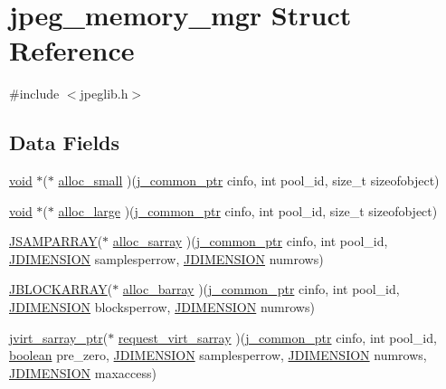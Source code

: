 \hypertarget{structjpeg__memory__mgr}{}\section{jpeg\+\_\+memory\+\_\+mgr Struct Reference}
\label{structjpeg__memory__mgr}


{\ttfamily \#include $<$jpeglib.\+h$>$}

\subsection*{Data Fields}
\begin{DoxyCompactItemize}
\item 
\hyperlink{png_8h_ac9c84fa68bbad002983e35ce3663c686}{void} $\ast$($\ast$ \hyperlink{structjpeg__memory__mgr_a682e2af140b98c505bf4a2310c59361b}{alloc\+\_\+small} )(\hyperlink{jpeglib_8h_a1a177ab705cefea8f30ec31a48e62650}{j\+\_\+common\+\_\+ptr} cinfo, int pool\+\_\+id, size\+\_\+t sizeofobject)
\item 
\hyperlink{png_8h_ac9c84fa68bbad002983e35ce3663c686}{void} $\ast$($\ast$ \hyperlink{structjpeg__memory__mgr_a92f58136389a42228d4380e0f16a16ab}{alloc\+\_\+large} )(\hyperlink{jpeglib_8h_a1a177ab705cefea8f30ec31a48e62650}{j\+\_\+common\+\_\+ptr} cinfo, int pool\+\_\+id, size\+\_\+t sizeofobject)
\item 
\hyperlink{jpeglib_8h_ac9d5d1b829ed51769db69a37271a7e91}{J\+S\+A\+M\+P\+A\+R\+R\+AY}($\ast$ \hyperlink{structjpeg__memory__mgr_a08372f39a3b7a2f48f0f27d6d8f6a2c3}{alloc\+\_\+sarray} )(\hyperlink{jpeglib_8h_a1a177ab705cefea8f30ec31a48e62650}{j\+\_\+common\+\_\+ptr} cinfo, int pool\+\_\+id, \hyperlink{jmorecfg_8h_a04ed4674f6f1d0d50ec241531e38274f}{J\+D\+I\+M\+E\+N\+S\+I\+ON} samplesperrow, \hyperlink{jmorecfg_8h_a04ed4674f6f1d0d50ec241531e38274f}{J\+D\+I\+M\+E\+N\+S\+I\+ON} numrows)
\item 
\hyperlink{jpeglib_8h_ab03cfeb937b60b9b73ca6e3cf935af49}{J\+B\+L\+O\+C\+K\+A\+R\+R\+AY}($\ast$ \hyperlink{structjpeg__memory__mgr_a59ff5a509aaecceb578d7c50ad29408e}{alloc\+\_\+barray} )(\hyperlink{jpeglib_8h_a1a177ab705cefea8f30ec31a48e62650}{j\+\_\+common\+\_\+ptr} cinfo, int pool\+\_\+id, \hyperlink{jmorecfg_8h_a04ed4674f6f1d0d50ec241531e38274f}{J\+D\+I\+M\+E\+N\+S\+I\+ON} blocksperrow, \hyperlink{jmorecfg_8h_a04ed4674f6f1d0d50ec241531e38274f}{J\+D\+I\+M\+E\+N\+S\+I\+ON} numrows)
\item 
\hyperlink{jpeglib_8h_abc0b975077507c35b5a577e3ce9e4d91}{jvirt\+\_\+sarray\+\_\+ptr}($\ast$ \hyperlink{structjpeg__memory__mgr_ae468489cab71fc3b5da594afb639f777}{request\+\_\+virt\+\_\+sarray} )(\hyperlink{jpeglib_8h_a1a177ab705cefea8f30ec31a48e62650}{j\+\_\+common\+\_\+ptr} cinfo, int pool\+\_\+id, \hyperlink{jconfig_8h_a7670a4e8a07d9ebb00411948b0bbf86d}{boolean} pre\+\_\+zero, \hyperlink{jmorecfg_8h_a04ed4674f6f1d0d50ec241531e38274f}{J\+D\+I\+M\+E\+N\+S\+I\+ON} samplesperrow, \hyperlink{jmorecfg_8h_a04ed4674f6f1d0d50ec241531e38274f}{J\+D\+I\+M\+E\+N\+S\+I\+ON} numrows, \hyperlink{jmorecfg_8h_a04ed4674f6f1d0d50ec241531e38274f}{J\+D\+I\+M\+E\+N\+S\+I\+ON} maxaccess)

\end{DoxyCompactItemize}
